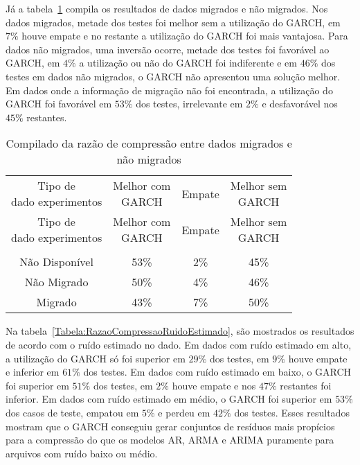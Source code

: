  Já a tabela~\ref{Tabela:RazaoCompressaoMigradoNaoMigrado} compila os resultados de dados migrados e não migrados. Nos dados migrados, metade dos testes foi melhor sem a utilização do GARCH, em $7\%$ houve empate e no restante a utilização do GARCH foi mais vantajosa. Para dados não migrados, uma inversão ocorre, metade dos testes foi 
 favorável ao GARCH, em $4\%$ a utilização ou não do GARCH foi indiferente e em $46\%$ dos testes em dados não migrados, o GARCH não apresentou uma solução melhor. Em dados onde a informação de migração não foi encontrada, a utilização do GARCH foi favorável em $53\%$ dos testes, irrelevante em $2\%$ e desfavorável nos $45\%$ restantes.
 
 
 \begin{center}
\begin{longtable}{cccc}
\toprule
\rowcolor{white}
 \caption{Compilado da razão de compressão entre dados migrados e não migrados}
 \label{Tabela:RazaoCompressaoMigradoNaoMigrado} \\
\midrule
\rowcolor{white}
   \specialcell{Tipo de\\dado experimentos} & \specialcell{Melhor com\\GARCH} &
   Empate & \specialcell{Melhor sem\\GARCH} \\
\midrule
\endfirsthead
\midrule
\rowcolor{white}
   \specialcell{Tipo de\\dado experimentos} & \specialcell{Melhor com\\GARCH} &
   Empate & \specialcell{Melhor sem\\GARCH} \\
\toprule
\endhead
\midrule \\ %
\endfoot
\bottomrule
\endlastfoot
    Não Disponível & 53\%  & 2\%   & 45\% \\
    Não Migrado & 50\%  & 4\%   & 46\% \\
    Migrado & 43\%  & 7\%   & 50\% \\
\end{longtable}
\end{center}
 
 
Na tabela~\ref{Tabela:RazaoCompressaoRuidoEstimado}, são mostrados os resultados de acordo com o ruído estimado no dado. Em dados com ruído estimado em alto, a utilização do GARCH só foi superior em $29\%$ dos testes, em $9\%$ houve empate e inferior em $61\%$ dos testes. Em dados com ruído estimado em baixo, o GARCH foi superior em $51\%$ dos testes, em $2\%$ houve empate e nos $47\%$ restantes foi inferior. Em dados com ruído estimado em médio, o GARCH foi superior em $53\%$ dos casos de teste, empatou em $5\%$ e perdeu em $42\%$ dos testes. Esses resultados mostram que o GARCH conseguiu gerar conjuntos de resíduos mais propícios para a compressão do que os modelos AR, ARMA e ARIMA puramente para arquivos com ruído baixo ou médio.

